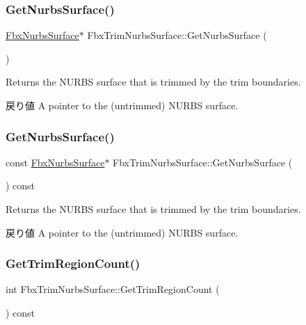 \subsubsection{\texorpdfstring{Get\+Nurbs\+Surface()}{GetNurbsSurface()}\hspace{0.1cm}{\footnotesize\ttfamily [1/2]}}
{\footnotesize\ttfamily \hyperlink{class_fbx_nurbs_surface}{Fbx\+Nurbs\+Surface}$\ast$ Fbx\+Trim\+Nurbs\+Surface\+::\+Get\+Nurbs\+Surface (\begin{DoxyParamCaption}{ }\end{DoxyParamCaption})}

Returns the N\+U\+R\+BS surface that is trimmed by the trim boundaries. \begin{DoxyReturn}{戻り値}
A pointer to the (untrimmed) N\+U\+R\+BS surface. 
\end{DoxyReturn}
\mbox{\label{class_fbx_trim_nurbs_surface_a3fdd293d9f7a6c950e25bd4130772236}} 
\subsubsection{\texorpdfstring{Get\+Nurbs\+Surface()}{GetNurbsSurface()}\hspace{0.1cm}{\footnotesize\ttfamily [2/2]}}
{\footnotesize\ttfamily const \hyperlink{class_fbx_nurbs_surface}{Fbx\+Nurbs\+Surface}$\ast$ Fbx\+Trim\+Nurbs\+Surface\+::\+Get\+Nurbs\+Surface (\begin{DoxyParamCaption}{ }\end{DoxyParamCaption}) const}

Returns the N\+U\+R\+BS surface that is trimmed by the trim boundaries. \begin{DoxyReturn}{戻り値}
A pointer to the (untrimmed) N\+U\+R\+BS surface. 
\end{DoxyReturn}
\mbox{\label{class_fbx_trim_nurbs_surface_af9deaac6001549449325ca4112e3a58a}} 
\subsubsection{\texorpdfstring{Get\+Trim\+Region\+Count()}{GetTrimRegionCount()}}
{\footnotesize\ttfamily int Fbx\+Trim\+Nurbs\+Surface\+::\+Get\+Trim\+Region\+Count (\begin{DoxyParamCaption}{ }\end{DoxyParamCaption}) const}

